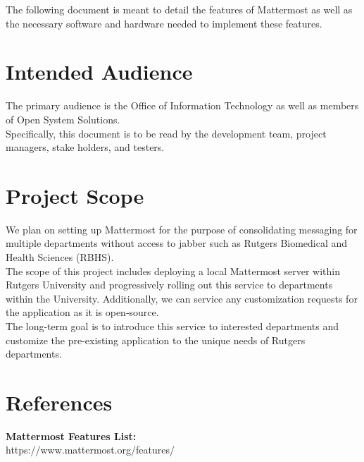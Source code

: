 \documentclass{scrreprt}
\begin{document}
The following document is meant to detail the features of Mattermost as well as
the necessary software and hardware needed to implement these features.

\section{Intended Audience}
The primary audience is the Office of Information Technology as well as members
of Open System Solutions.\\

Specifically, this document is to be read by the development team,
project managers, stake holders, and testers.

\section{Project Scope}
We plan on setting up Mattermost for the purpose of consolidating messaging for
multiple departments without access to jabber such as Rutgers Biomedical
and Health Sciences (RBHS).\\

The scope of this project includes deploying a local Mattermost server within
Rutgers University and progressively rolling out this service to departments
within the University.  Additionally, we can service any customization requests
for the application as it is open-source.\\

The long-term goal is to introduce this service to interested departments and
customize the pre-existing application to the unique needs of Rutgers
departments.

\section{References}

\noindent
\textbf{Mattermost Features List:}\\
https://www.mattermost.org/features/\\
\end{document}
